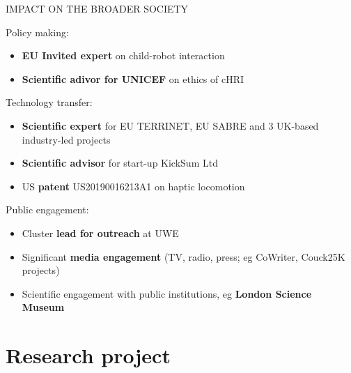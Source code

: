 \documentclass[xcolor=table]{beamer}
\makeatletter
\let\beamer@writeslidentry@miniframeson=\beamer@writeslidentry
\newcommand*{\miniframeson}{\let\beamer@writeslidentry=\beamer@writeslidentry@miniframeson}
\makeatother
\begin{document}
\begin{frame}{IMPACT ON THE BROADER SOCIETY}

    Policy making:

    \begin{itemize}
        \item \textbf{EU Invited expert} on child-robot interaction
        \item \textbf{Scientific adivor for UNICEF} on ethics of cHRI
    \end{itemize}

    Technology transfer:
    \begin{itemize}
        \item \textbf{Scientific expert} for EU TERRINET, EU SABRE and 3 UK-based
            industry-led projects
        \item \textbf{Scientific advisor} for start-up KickSum Ltd
        \item US \textbf{patent} US20190016213A1 on haptic locomotion
    \end{itemize}

    Public engagement:
    \begin{itemize}
        \item Cluster \textbf{lead for outreach} at UWE
        \item Significant \textbf{media engagement} (TV, radio, press; eg CoWriter, Couck25K projects)
        \item Scientific engagement with public institutions, eg \textbf{London
            Science Museum}
    \end{itemize}

\end{frame}



\miniframeson{}

\section{Research project}
\end{document}
